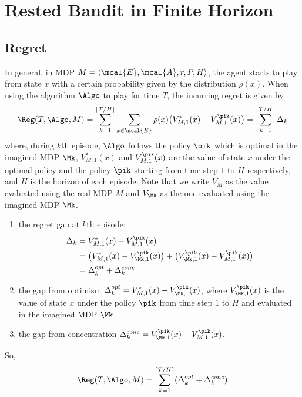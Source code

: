 \chapter{Rested Bandit in Finite Horizon}
\label{ch:rested_bandit}

\section{Regret}
\label{sec:regret}

In general, in MDP $M=\langle\mcal{E},\mcal{A},r,P,H\rangle$, the agent starts to play from state $x$ with a certain probability given by the distribution $\rho(x)$. When using the algorithm $\Algo$ to play for time $T$, the incurring regret is given by
\begin{align}
\Reg(T,\Algo,M)=\sum_{k=1}^{\lceil T/H\rceil}\sum_{x\in\mcal{E}}\rho(x)\big(V_{M,1}^*(x) -V_{M,1}^{\pik}(x)\big) =\sum_{k=1}^{\lceil T/H\rceil}\Delta_k
\end{align}
where, during $k$th episode, $\Algo$ follows the policy $\pik$ which is optimal in the imagined MDP $\Mk$, $V^*_{M,1}(x)$ and $V_{M,1}^{\pik}(x)$ are the value of state $x$ under the optimal policy and the policy $\pik$ starting from time step $1$ to $H$ respectively, and $H$ is the horizon of each episode.
Note that we write $V_M$ as the value evaluated using the real MDP $M$ and $V_{\Mk}$ as the one evaluated using the imagined MDP $\Mk$.

\begin{enumerate}
\item the regret gap at $k$th episode:
\begin{align*}
\Delta_k &=V_{M,1}^*(x) -V_{M,1}^{\pik}(x) \\
&=\big(V^*_{M,1}(x) -V^{\pik}_{\Mk,1}(x)\big) +\big(V^{\pik}_{\Mk,1}(x) -V_{M,1}^{\pik}(x)\big) \\
&=\Delta_k^{opt}+\Delta_k^{conc}
\end{align*}
\item the gap from optimism $\Delta_k^{opt}=V^*_{M,1}(x) -V^{\pik}_{\Mk,1}(x)$, where $V^{\pik}_{\Mk,1}(x)$ is the value of state $x$ under the policy $\pik$ from time step $1$ to $H$ and evaluated in the imagined MDP $\Mk$
\item the gap from concentration $\Delta_k^{conc}=V^{\pik}_{\Mk,1}(x) -V_{M,1}^{\pik}(x)$.
\end{enumerate}
So,
\begin{equation}
\label{eq:eq_6}
\Reg(T,\Algo,M)= \sum_{k=1}^{\lceil T/H\rceil}(\Delta_k^{opt}+\Delta_k^{conc})
\end{equation}

